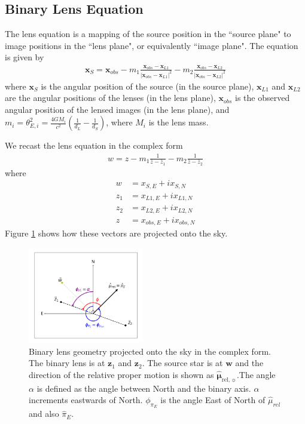 \documentclass[twocolumn]{aastex701}
\newcommand{\vect}[1]{\boldsymbol{#1}}
\newcommand{\murelhat}{\boldsymbol{\hat{\mu}}_{\boldsymbol{\mathrm{rel}},\sun}}
\begin{document}


\subsection{Binary Lens Equation}
\label{sec:binlenses_eqn}
The lens equation \citep{Schneider_1986} is a mapping of the source position in the ``source plane" to image positions in the ``lens plane", or equivalently ``image plane". The equation is given by
\begin{eqnarray}
    \vect{x}_S = \vect{x}_{obs} - m_1\frac{\vect{x}_{obs} - \vect{x}_{L1}}{|\vect{x}_{obs} - \vect{x}_{L1}|^2} - m_2\frac{\vect{x}_{obs} - \vect{x}_{L2}}{|\vect{x}_{obs} - \vect{x}_{L2}|^2}
\end{eqnarray}
%
where $\vect{x}_S$ is the angular position of the source (in the source plane), $\vect{x}_{L1}$ and $\vect{x}_{L2}$ are the angular positions of the lenses (in the lens plane), $\vect{x}_{obs}$ is the observed angular position of the lensed images (in the lens plane), and $m_i = \theta_{E, i} ^2 = \frac{4GM_i}{c^2}(\frac{1}{d_L} - \frac{1}{d_S})$, where $M_i$ is the lens mass. 

We recast the lens equation in the complex form
\begin{eqnarray}
\label{eqn:lenseqn}
    w = z - m_1 \frac{1}{\bar{z} - \bar{z}_1} - m_2 \frac{1}{\bar{z} - \bar{z}_2}
\end{eqnarray}
%
where
\begin{eqnarray}
    w &= x_{S,E} + i x_{S,N} \\
    z_1 &= x_{L1,E} + i x_{L1,N} \\
    z_2 &= x_{L2,E} + i x_{L2,N} \\
    z &= x_{obs,E} + i x_{obs,N}
\end{eqnarray}
Figure \ref{fig:geometry_binary} shows how these vectors are projected onto the sky. 

\begin{figure}
    \centering
    \includegraphics[width=0.45\textwidth]{figures/geometry_schematic_binary_lens.png}
    \caption{
    Binary lens geometry projected onto the sky in the complex form. 
    The binary lens is at $\vect{z}_1$ and $\vect{z}_2$. The source star 
    is at $\vect{w}$ and the direction of the relative proper motion is shown as $\murelhat$.The angle $\alpha$ is defined as the angle between North and the binary axis. $\alpha$ increments eastwards of North. $\phi_{\pi_E}$ is the angle East of North of $\hat{\mu}_{rel}$ and also $\hat{\pi}_E$. 
    \label{fig:geometry_binary}
    }
\end{figure}
\end{document}
